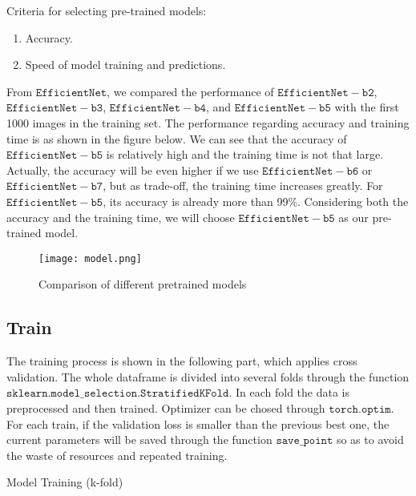 \documentclass[final]{cvpr}
\begin{document}
    Criteria for selecting pre-trained models:
    \begin{enumerate}
        \item Accuracy.
        \item Speed of model training and predictions.
    \end{enumerate}
    From $\mathtt{EfficientNet}$, we compared the performance of $\mathtt{EfficientNet-b2}$, $\mathtt{EfficientNet-b3}$, $\mathtt{EfficientNet-b4}$, and $\mathtt{EfficientNet-b5}$ with the first 1000 images in the training set. The performance regarding accuracy and training time is as shown in the figure below. We can see that the accuracy of $\mathtt{EfficientNet-b5}$ is relatively high and the training time is not that large. Actually, the accuracy will be even higher if we use $\mathtt{EfficientNet-b6}$ or $\mathtt{EfficientNet-b7}$, but as trade-off, the training time increases greatly. For $\mathtt{EfficientNet-b5}$, its accuracy is already more than 99\%. Considering both the accuracy and the training time, we will choose $\mathtt{EfficientNet-b5}$ as our pre-trained model.
    
\begin{figure}[htbp]
    \centering
    \texttt{[image: model.png]}
    \caption{Comparison of different pretrained models}
\end{figure}
    
\subsection{Train}
The training process is shown in the following part, which applies cross validation. The whole dataframe is divided into several folds through the function $\mathtt{sklearn.model\_selection.StratifiedKFold}$. In each fold the data is preprocessed and then trained. Optimizer can be chosed through $\mathtt{torch.optim}$. For each train, if the validation loss is smaller than the previous best one, the current parameters will be saved through the function $\mathtt{save\_point}$ so as to avoid the waste of resources and repeated training.

\begin{algorithm}\label{train}
\caption{Model Training (k-fold)}
\end{algorithm} 
\end{document}
